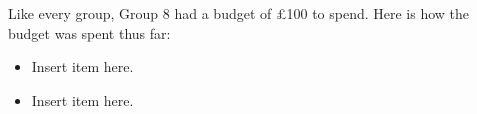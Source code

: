 Like every group, Group 8 had a budget of £100 to spend. Here is how the budget was spent thus far:
\begin{itemize}
  \itemsep0em 
  \item Insert item here.
  \item Insert item here.
\end{itemize}